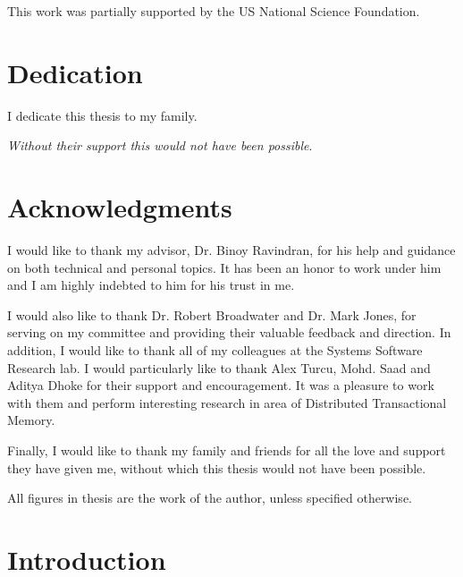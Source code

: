 \documentclass[12pt,dvips]{report}
\begin{document}
\vfill


This work was partially supported by the US National Science Foundation.

\pagebreak

\chapter*{Dedication}

\begin{center}
I dedicate this thesis to my family. 

\textit{Without their support this would not have been possible}.
\end{center}

\chapter*{Acknowledgments}

I would like to thank my advisor, Dr. Binoy Ravindran, for his 
help and guidance on both technical and personal 
topics. It has been an honor to work under him and I am highly indebted
to him for his trust in me.

I would also like to thank Dr. Robert Broadwater and Dr. Mark Jones,
for serving on my committee and providing their valuable feedback
and direction. In addition, I would like to thank all of my colleagues
at the Systems Software Research lab. I would particularly like to thank
Alex Turcu, Mohd. Saad and Aditya Dhoke for their support and encouragement.
It was a pleasure to work with them and perform interesting research in area 
of Distributed Transactional Memory.

Finally, I would like to thank my family and friends for all the
love and support they have given me, without which this thesis would 
not have been possible.

All figures in thesis are the work of the author, unless specified otherwise.

\tableofcontents
\pagebreak

\listoffigures
\pagebreak

\listofalgorithms
\pagebreak

\listoftables
\pagebreak

\printnomenclature
\pagebreak

\pagestyle{myheadings}


\chapter{Introduction}\label{chap:intro}
\end{document}
